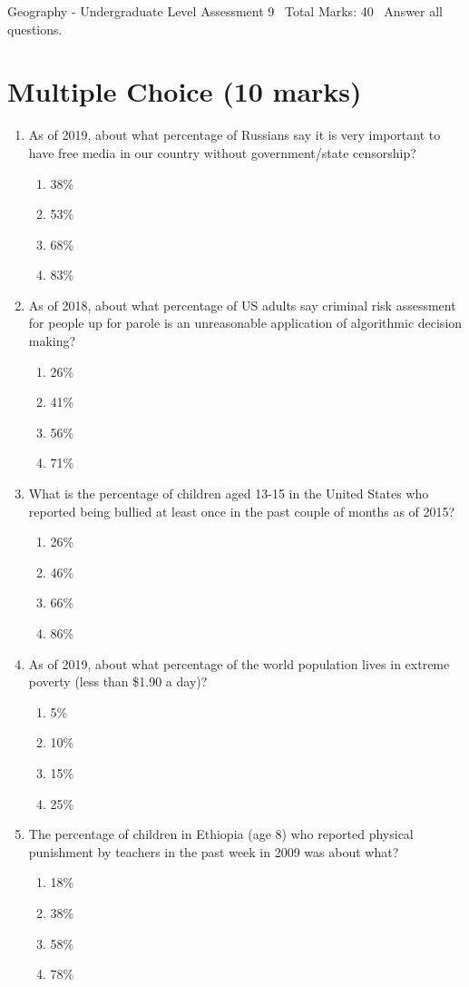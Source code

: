 \documentclass[12pt]{article}
\begin{document}
\begin{center}
Geography - Undergraduate Level Assessment 9 \
Total Marks: 40 \
Answer all questions.
\end{center}

\section*{Multiple Choice (10 marks)}
\begin{enumerate}[label=\arabic*.]
\item As of 2019, about what percentage of Russians say it is very important to have free media in our country without government/state censorship?
\begin{enumerate}[label=(\alph*)]
    \item 38\%
    \item 53\%
    \item 68\%
    \item 83\%
\end{enumerate}
\item As of 2018, about what percentage of US adults say criminal risk assessment for people up for parole is an unreasonable application of algorithmic decision making?
\begin{enumerate}[label=(\alph*)]
    \item 26\%
    \item 41\%
    \item 56\%
    \item 71\%
\end{enumerate}
\item What is the percentage of children aged 13-15 in the United States who reported being bullied at least once in the past couple of months as of 2015?
\begin{enumerate}[label=(\alph*)]
    \item 26\%
    \item 46\%
    \item 66\%
    \item 86\%
\end{enumerate}
\item As of 2019, about what percentage of the world population lives in extreme poverty (less than \$1.90 a day)?
\begin{enumerate}[label=(\alph*)]
    \item 5\%
    \item 10\%
    \item 15\%
    \item 25\%
\end{enumerate}
\item The percentage of children in Ethiopia (age 8) who reported physical punishment by teachers in the past week in 2009 was about what?
\begin{enumerate}[label=(\alph*)]
    \item 18\%
    \item 38\%
    \item 58\%
    \item 78\%
\end{enumerate}
\end{enumerate}
\end{document}
